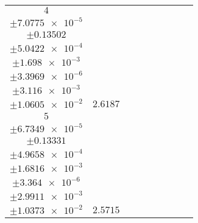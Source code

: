 \documentclass[8pt]{article}
\begin{document}
\begin{longtable}[l]{c c c c c c c c c}
$\num{4}$ & \begin{tabular}[c]{@{}c@{}}$\num{3.0419e-2}$ \\ $\pm\num{7.0775e-5}$\end{tabular} & \begin{tabular}[c]{@{}c@{}}$\num{-0.54518}$ \\ $\pm\num{0.13502}$\end{tabular} & \begin{tabular}[c]{@{}c@{}}$\num{-5.6982}$ \\ $\pm\num{5.0422e-4}$\end{tabular} & \begin{tabular}[c]{@{}c@{}}$\num{1.8519e+3}$ \\ $\pm\num{1.698e-3}$\end{tabular} & \begin{tabular}[c]{@{}c@{}}$\num{3.7047}$ \\ $\pm\num{3.3969e-6}$\end{tabular} & \begin{tabular}[c]{@{}c@{}}$\num{1.1672}$ \\ $\pm\num{3.116e-3}$\end{tabular} & \begin{tabular}[c]{@{}c@{}}$\num{4.2405}$ \\ $\pm\num{1.0605e-2}$\end{tabular} & $\num{2.6187}$\\
$\num{5}$ & \begin{tabular}[c]{@{}c@{}}$\num{2.9711e-2}$ \\ $\pm\num{6.7349e-5}$\end{tabular} & \begin{tabular}[c]{@{}c@{}}$\num{-0.11959}$ \\ $\pm\num{0.13331}$\end{tabular} & \begin{tabular}[c]{@{}c@{}}$\num{5.6998}$ \\ $\pm\num{4.9658e-4}$\end{tabular} & \begin{tabular}[c]{@{}c@{}}$\num{1.8633e+3}$ \\ $\pm\num{1.6816e-3}$\end{tabular} & \begin{tabular}[c]{@{}c@{}}$\num{3.7275}$ \\ $\pm\num{3.364e-6}$\end{tabular} & \begin{tabular}[c]{@{}c@{}}$\num{1.1367}$ \\ $\pm\num{2.9911e-3}$\end{tabular} & \begin{tabular}[c]{@{}c@{}}$\num{4.1822}$ \\ $\pm\num{1.0373e-2}$\end{tabular} & $\num{2.5715}$\\

\end{longtable}
\end{document}
